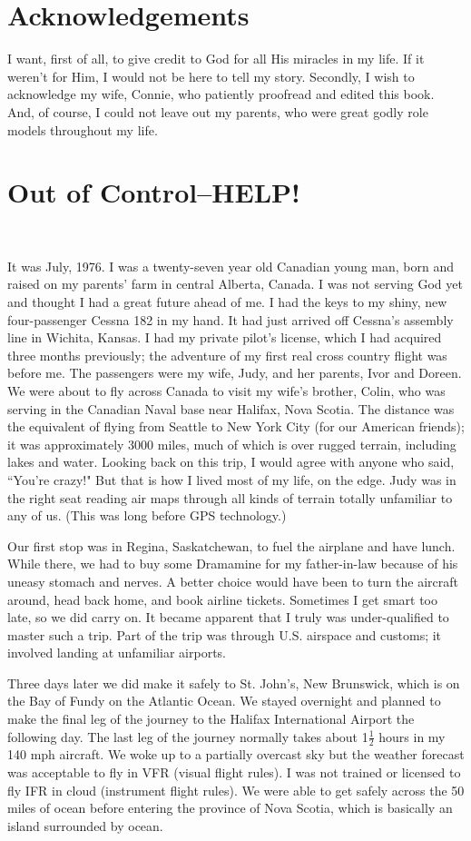 \documentclass[oneside,12pt]{book}
\begin{document}
\chapter{Acknowledgements}
I want, first of all, to give credit to God for all His miracles in my life. If it weren't for Him, I would not be here to tell my story. Secondly, I wish to acknowledge my wife, Connie, who patiently proofread and edited this book. And, of course, I could not leave out my parents, who were great godly role models throughout my life.
\clearpage
\tableofcontents
\clearpage
\mainmatter
\chapter{Out of Control--HELP!}
\

It was July, 1976. I was a twenty-seven year old Canadian young man, born and raised on my parents' farm in central Alberta, Canada. I was not serving God yet and thought I had a great future ahead of me. I had the keys to my shiny, new four-passenger Cessna 182 in my hand. It had just arrived off Cessna's assembly line in Wichita, Kansas. I had my private pilot's license, which I had acquired three months previously; the adventure of my first real cross country flight was before me. The passengers were my wife, Judy, and her parents, Ivor and Doreen. We were about to fly across Canada to visit my wife's brother, Colin, who was serving in the Canadian Naval base near Halifax, Nova Scotia. The distance was the equivalent of flying from Seattle to New York City (for our American friends); it was approximately 3000 miles, much of which is over rugged terrain, including lakes and water. Looking back on this trip, I would agree with anyone who said, ``You're crazy!" But that is how I lived most of my life, on the edge. Judy was in the right seat reading air maps through all kinds of terrain totally unfamiliar to any of us. (This was long before GPS technology.)

Our first stop was in Regina, Saskatchewan, to fuel the airplane and have lunch. While there, we had to buy some Dramamine for my father-in-law because of his uneasy stomach and nerves. A better choice would have been to turn the aircraft around, head back home, and book airline tickets. Sometimes I get smart too late, so we did carry on. It became apparent that I truly was under-qualified to master such a trip. Part of the trip was through U.S. airspace and customs; it involved landing at unfamiliar airports. 

Three days later we did make it safely to St. John's, New Brunswick, which is on the Bay of Fundy on the Atlantic Ocean. We stayed overnight and planned to make the final leg of the journey to the Halifax International Airport the following day. The last leg of the journey normally takes about 1$\frac{1}{2}$ hours in my 140 mph aircraft. We woke up to a partially overcast sky but the weather forecast was acceptable to fly in VFR (visual flight rules). I was not trained or licensed to fly IFR in cloud (instrument flight rules). We were able to get safely across the 50 miles of ocean before entering the province of Nova Scotia, which is basically an island surrounded by ocean. 
\end{document}
